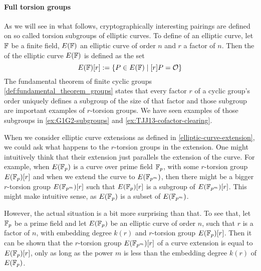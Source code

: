 \paragraph{Full torsion groups} As we will see in what follows, cryptographically interesting pairings are defined on so called torsion subgroups of elliptic curves. To define  of an elliptic curve, let $\mathbb{F}$ be a finite field, $E(\mathbb{F})$ an elliptic curve of order $n$ and $r$ a factor of $n$. Then the  of the elliptic curve $E(\mathbb{F})$ is defined as the set
\begin{equation}
\label{def:torsion_group}
E(\mathbb{F})[r]:= \{P\in E(\mathbb{F})\;|\; [r]P = \mathcal{O}\}
\end{equation} 
The fundamental theorem of finite cyclic groups \ref{def:fundamental_theorem_groups} states that every factor $r$ of a cyclic group's order uniquely defines a subgroup of the size of that factor and those subgroup are important examples of $r$-torsion groups. We have seen examples of those subgroups in \ref{ex:G1G2-subgroups} and \ref{ex:TJJ13-cofactor-clearing}.

When we consider elliptic curve extensions as defined in \ref{elliptic-curve-extension}, we could ask what happens to the $r$-torsion groups in the extension. One might intuitively think that their extension just parallels the extension of the curve. For example, when $E(\mathbb{F}_p)$ is a curve over prime field $\mathbb{F}_p$, with some $r$-torsion group $E(\mathbb{F}_p)[r]$ and when we extend the curve to $E(\mathbb{F}_{p^m})$, then there might be a bigger $r$-torsion group $E(\mathbb{F}_{p^m})[r]$ such that $E(\mathbb{F}_p)[r]$ is a subgroup of $E(\mathbb{F}_{p^m})[r]$. This might make intuitive sense, as $E(\mathbb{F}_p)$ is a subset of $E(\mathbb{F}_{p^m})$. 

However, the actual situation is a bit more surprising than that. To see that, let $\mathbb{F}_p$ be a prime field and let $E(\mathbb{F}_p)$ be an elliptic curve of order $n$, such that $r$ is a factor of $n$, with embedding degree $k(r)$ and $r$-torsion group $E(\mathbb{F}_p)[r]$. Then it can be shown that the $r$-torsion group $E(\mathbb{F}_{p^m})[r]$ of a curve extension is equal to $E(\mathbb{F}_p)[r]$, only as long as the power $m$ is less than the embedding degree $k(r)$ of $E(\mathbb{F}_p)$. 

